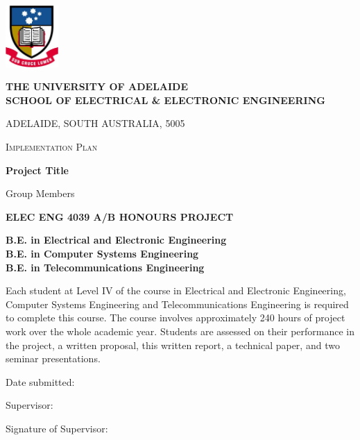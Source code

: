 \documentclass[a4paper,12pt]{article}
\begin{document}
\begin{titlepage}
\vspace{-1.5cm}
\begin{center}
\includegraphics[width=2cm]{ualogo_colour.jpg}
\vspace{1cm}

\textbf{\large THE UNIVERSITY OF ADELAIDE}\\

\textbf{SCHOOL OF ELECTRICAL \& ELECTRONIC ENGINEERING}

{\small ADELAIDE, SOUTH AUSTRALIA, 5005}

\vspace{1.5cm}
\textsc{Implementation Plan}
\vspace{1cm}

\textbf{\LARGE Project Title}

\vspace{1cm}
{\Large Group Members}

\vspace{4cm}
\textbf{\large ELEC ENG 4039 A/B HONOURS PROJECT}

\vspace{1ex}
\setlength{\linespread}{1}
\textbf{B.E. in Electrical and Electronic Engineering\\
B.E. in Computer Systems Engineering\\
B.E. in Telecommunications Engineering\\}
\end{center}

\vfill
Each student at Level IV of the course in Electrical and
Electronic Engineering, Computer Systems Engineering and
Telecommunications Engineering is required to complete this course.
The course involves approximately 240 hours of project work over the
whole academic year.  Students are assessed on their performance in
the project, a written proposal, this written report, a technical
paper, and two seminar presentations.

\vspace{1cm}
Date submitted:

\vspace{1ex}
Supervisor:

\vspace{1ex}
Signature of Supervisor:
\end{titlepage}
\end{document}
